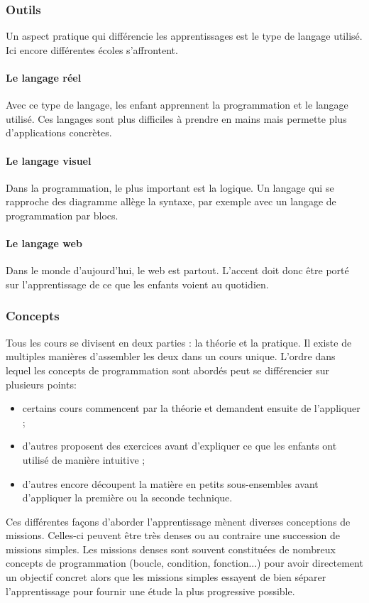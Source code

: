 \subsubsection{Outils} 
Un aspect pratique qui différencie les apprentissages est le type de langage utilisé. Ici encore différentes écoles s'affrontent.

\paragraph{Le langage réel} Avec ce type de langage, les enfant apprennent la programmation et le langage utilisé. Ces langages sont plus difficiles à prendre en mains mais permette plus d'applications concrètes.
\paragraph{Le langage visuel} Dans la programmation, le plus important est la logique. Un langage qui se rapproche des diagramme allège la syntaxe, par exemple avec un langage de programmation par blocs. 
\paragraph{Le langage web} Dans le monde d'aujourd'hui, le web est partout. L'accent doit donc être porté sur l'apprentissage de ce que les enfants voient au quotidien.


\subsubsection{Concepts} 
Tous les cours se divisent en deux parties : la théorie et la pratique. Il existe de multiples manières d'assembler les deux dans un cours unique. L'ordre dans lequel les concepts de programmation sont abordés peut se différencier sur plusieurs points:
\begin{itemize}
  \item certains cours commencent par la théorie et demandent ensuite de l'appliquer ;
  \item d'autres proposent des exercices avant d'expliquer ce que les enfants ont utilisé de manière intuitive ;
  \item d'autres encore découpent la matière en petits sous-ensembles avant d'appliquer la première ou la seconde technique.\\
\end{itemize}


Ces différentes façons d'aborder l'apprentissage mènent diverses conceptions de missions. Celles-ci peuvent être très denses ou au contraire une succession de missions simples. Les missions denses sont souvent constituées de nombreux concepts de programmation (boucle, condition, fonction...) pour avoir directement un objectif concret alors que les missions simples essayent de bien séparer l'apprentissage pour fournir une étude la plus progressive possible.\\

